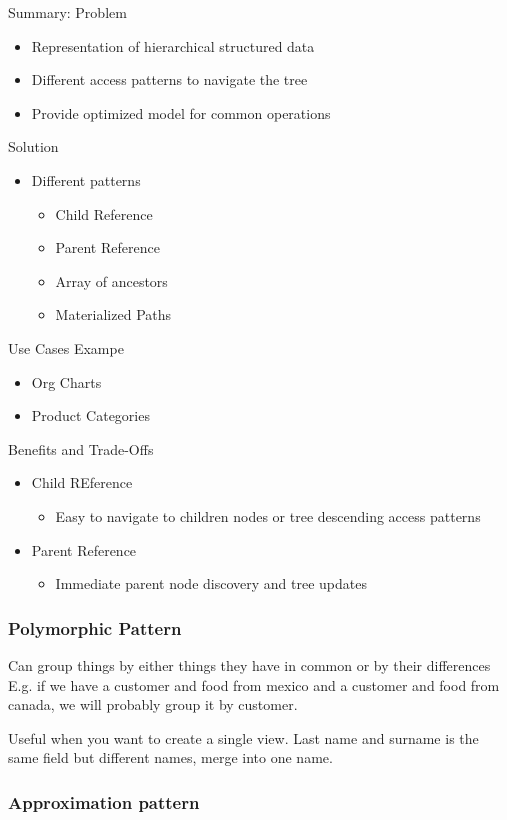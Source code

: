 \documentclass[11pt]{article}
\begin{document}
Summary:
Problem
\begin{itemize}
\item Representation of hierarchical structured data
\item Different access patterns to navigate the tree
\item Provide optimized model for common operations
\end{itemize}

Solution
\begin{itemize}
\item Different patterns
\begin{itemize}
\item Child Reference
\item Parent Reference
\item Array of ancestors
\item Materialized Paths
\end{itemize}
\end{itemize}

Use Cases Exampe
\begin{itemize}
\item Org Charts
\item Product Categories
\end{itemize}

Benefits and Trade-Offs
\begin{itemize}
\item Child REference
\begin{itemize}
\item Easy to navigate to children nodes or tree descending access patterns
\end{itemize}
\item Parent Reference
\begin{itemize}
\item Immediate parent node discovery and tree updates
\end{itemize}
\end{itemize}

\subsubsection{Polymorphic Pattern}
\label{sec:org96ee1ba}
Can group things by either things they have in common or by their differences
E.g. if we have a customer and food from mexico and a customer and food from canada, we will probably group it by customer.

Useful when you want to create a single view. Last name and surname is the same field but different names, merge into one name.

\subsubsection{Approximation pattern}
\label{sec:org8b2c6d7}
\end{document}
